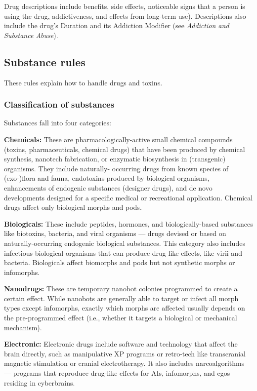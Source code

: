 {{Drug descriptions include benefits, side effects, noticeable signs that a person is using the drug, addictiveness, and effects from long-term use). Descriptions also include the drug’s Duration and its Addiction Modifier (see \emph{Addiction and Substance Abuse}). 

\subsection{Substance rules} \label{sec:substance-rules} 

These rules explain how to handle drugs and toxins. 

\subsubsection{Classification of substances} 

Substances fall into four categories: 

\textbf{Chemicals:} These are pharmacologically-active small chemical compounds (toxins, pharmaceuticals, chemical drugs) that have been produced by chemical synthesis, nanotech fabrication, or enzymatic biosynthesis in (transgenic) organisms. They include naturally- occurring drugs from known species of (exo-)flora and fauna, endotoxins produced by biological organisms, enhancements of endogenic substances (designer drugs), and de novo developments designed for a specific medical or recreational application. Chemical drugs affect only biological morphs and pods. 

\textbf{Biologicals:} These include peptides, hormones, and biologically-based substances like biotoxins, bacteria, and viral organisms --- drugs devised or based on naturally-occurring endogenic biological substances. This category also includes infectious biological organisms that can produce drug-like effects, like virii and bacteria. Biologicals affect biomorphs and pods but not synthetic morphs or infomorphs. 

\textbf{Nanodrugs:} These are temporary nanobot colonies programmed to create a certain effect. While nanobots are generally able to target or infect all morph types except infomorphs, exactly which morphs are affected usually depends on the pre-programmed effect (i.e., whether it targets a biological or mechanical mechanism). 

\textbf{Electronic:} Electronic drugs include software and technology that affect the brain directly, such as manipulative XP programs or retro-tech like transcranial magnetic stimulation or cranial electrotherapy. It also includes narcoalgorithms --- programs that reproduce drug-like effects for AIs, infomorphs, and egos residing in cyberbrains. 

}}
